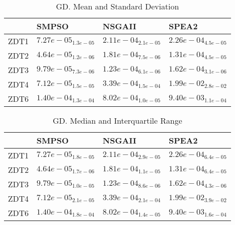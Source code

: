 \documentclass{article}
\begin{document}
\begin{table}
\caption{GD. Mean and Standard Deviation}
\label{table: GD}
\centering
\begin{scriptsize}
\begin{tabular}{llll}
\hline & SMPSO & NSGAII &  SPEA2\\
\hline 
ZDT1 & \cellcolor{gray95}$  7.27e-05_{ 1.3e-05}$ & \cellcolor{gray25}$  2.11e-04_{ 2.1e-05}$ & $  2.26e-04_{ 4.5e-05}$ \\
ZDT2 & \cellcolor{gray95}$  4.64e-05_{ 1.2e-06}$ & $  1.81e-04_{ 7.5e-06}$ & \cellcolor{gray25}$  1.31e-04_{ 4.5e-05}$ \\
ZDT3 & \cellcolor{gray95}$  9.79e-05_{ 7.3e-06}$ & \cellcolor{gray25}$  1.23e-04_{ 6.1e-06}$ & $  1.62e-04_{ 3.1e-06}$ \\
ZDT4 & \cellcolor{gray95}$  7.12e-05_{ 1.5e-05}$ & \cellcolor{gray25}$  3.39e-04_{ 1.5e-04}$ & $  1.99e-02_{ 2.8e-02}$ \\
ZDT6 & \cellcolor{gray95}$  1.40e-04_{ 1.3e-04}$ & \cellcolor{gray25}$  8.02e-04_{ 1.0e-05}$ & $  9.40e-03_{ 1.1e-04}$ \\
\hline
\end{tabular}
\end{scriptsize}
\end{table}

\begin{table}
\caption{GD. Median and Interquartile Range}
\label{table: GD}
\centering
\begin{scriptsize}
\begin{tabular}{llll}
\hline & SMPSO & NSGAII &  SPEA2\\
\hline 
ZDT1 & \cellcolor{gray95}$  7.27e-05_{ 1.8e-05}$ & \cellcolor{gray25}$  2.11e-04_{ 2.9e-05}$ & $  2.26e-04_{ 6.4e-05}$ \\
ZDT2 & \cellcolor{gray95}$  4.64e-05_{ 1.7e-06}$ & $  1.81e-04_{ 1.1e-05}$ & \cellcolor{gray25}$  1.31e-04_{ 6.4e-05}$ \\
ZDT3 & \cellcolor{gray95}$  9.79e-05_{ 1.0e-05}$ & \cellcolor{gray25}$  1.23e-04_{ 8.6e-06}$ & $  1.62e-04_{ 4.3e-06}$ \\
ZDT4 & \cellcolor{gray95}$  7.12e-05_{ 2.1e-05}$ & \cellcolor{gray25}$  3.39e-04_{ 2.1e-04}$ & $  1.99e-02_{ 3.9e-02}$ \\
ZDT6 & \cellcolor{gray95}$  1.40e-04_{ 1.8e-04}$ & \cellcolor{gray25}$  8.02e-04_{ 1.4e-05}$ & $  9.40e-03_{ 1.6e-04}$ \\
\hline
\end{tabular}
\end{scriptsize}
\end{table}
\end{document}
